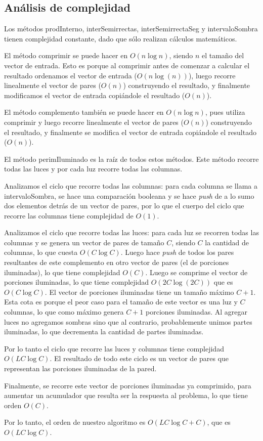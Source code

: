\subsection*{Análisis de complejidad}

Los métodos prodInterno, interSemirrectas, interSemirrectaSeg y intervaloSombra
tienen complejidad constante, dado que sólo realizan cálculos matemáticos.

El método comprimir se puede hacer en $O(n\log n)$, siendo $n$ el tamaño
del vector de entrada. Esto es porque al comprimir antes de comenzar a
calcular el resultado ordenamos el vector de entrada ($O(n\log(n))$), luego
recorre linealmente el vector de pares ($O(n)$) construyendo el resultado, y
finalmente modificamos el vector de entrada copiándole el resultado ($O(n)$).

El método complemento también se puede hacer en $O(n\log n)$, pues
utiliza comprimir y luego recorre linealmente el vector de pares ($O(n)$)
construyendo el resultado, y finalmente se modifica el vector de entrada
copiándole el resultado ($O(n)$).

El método perimIluminado es la raíz de todos estos métodos. Este método
recorre todas las luces y por cada luz recorre todas las columnas.

Analizamos el ciclo que recorre todas las columnas: para cada columna
se llama a intervaloSombra, se hace una comparación booleana y se hace {\sl push}
de a lo sumo dos elementos detrás de un vector de pares, por lo que el cuerpo
del ciclo que recorre las columnas tiene complejidad de $O(1)$.

Analizamos el ciclo que recorre todas las luces: para cada luz se recorren
todas las columnas y se genera un vector de pares de tamaño $C$, siendo $C$
la cantidad de columnas, lo que cuesta $O(C\log C)$. Luego hace
{\sl push} de todos los pares resultantes de este complemento en otro vector de
pares (el de porciones iluminadas), lo que tiene complejidad
$O(C)$. Luego se comprime el vector de porciones iluminadas, lo que tiene
complejidad $O(2C\log(2C))$ que es $O(C\log C)$. El vector de porciones
iluminadas tiene un tamaño máximo $C+1$. Esta cota es porque el peor caso
para el tamaño de este vector es una luz y $C$ columnas, lo que como máximo
genera $C+1$ porciones iluminadas. Al agregar luces no agregamos sombras sino
que al contrario, probablemente unimos partes iluminadas, lo que decrementa
la cantidad de partes iluminadas.

Por lo tanto el ciclo que recorre las luces y columnas tiene complejidad
$O(LC\log C)$. El resultado de todo este ciclo es un vector de pares que
representan las porciones iluminadas de la pared.

Finalmente, se recorre este vector de porciones iluminadas ya comprimido, para
aumentar un acumulador que resulta ser la respuesta al problema, lo que tiene
orden $O(C)$.

Por lo tanto, el orden de nuestro algoritmo es $O(LC\log C+C)$, que es $O(LC\log C)$.
